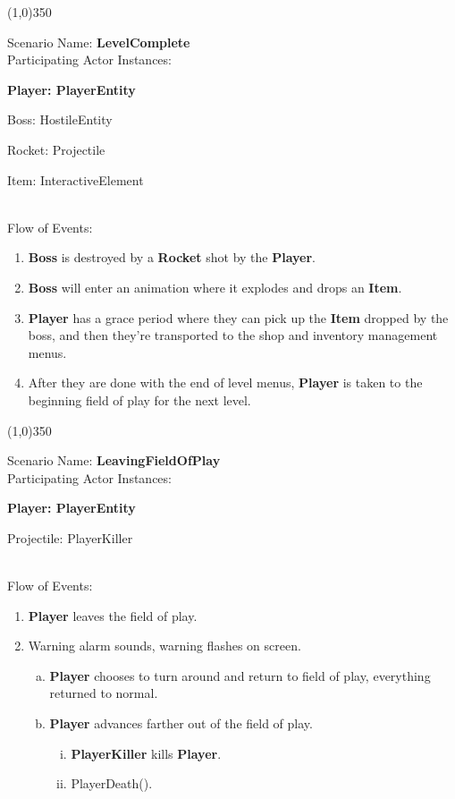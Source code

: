 \documentclass[12pt]{article}       %
\begin{document}
\begin{center} \line(1,0){350} \end{center}
Scenario Name: {\bf LevelComplete} \\
Participating Actor Instances:        \hspace{46pt} {\bf Player: PlayerEntity

					          \hspace{2.6 in}   Boss: HostileEntity 

                                                      \hspace{2.6 in}   Rocket: Projectile 

					          \hspace{2.6in}    Item: InteractiveElement} \vspace{10pt}  \\ 
Flow of Events: 
\begin{enumerate} 
\item {\bf Boss} is destroyed by a {\bf Rocket} shot by the {\bf Player}.
\item {\bf Boss} will enter an animation where it explodes and drops an {\bf Item}.
\item {\bf Player} has a grace period where they can pick up the {\bf Item} dropped by the boss, and then they’re transported to the shop and inventory management menus.
\item After they are done with the end of level menus, {\bf Player} is taken to the beginning field of play for the next level. 
\end{enumerate}

\begin{center} \line(1,0){350} \end{center}
Scenario Name: {\bf LeavingFieldOfPlay} \\
Participating Actor Instances:        \hspace{46pt} {\bf Player: PlayerEntity

					          \hspace{2.6 in}  Projectile: PlayerKiller}  \vspace{10pt}  \\ 
Flow of Events: 
\begin{enumerate} 
\item {\bf Player} leaves the field of play.
\item Warning alarm sounds, warning flashes on screen.
      \begin{enumerate}[a.]
       \item {\bf Player} chooses to turn around and return to field of play, everything returned to normal.
       \item {\bf Player} advances farther out of the field of play.
                \begin{enumerate}[i.]
                \item {\bf PlayerKiller} kills {\bf Player}.
	     \item PlayerDeath().
                \end{enumerate}
        \end{enumerate}
\end{enumerate}
\end{document}
